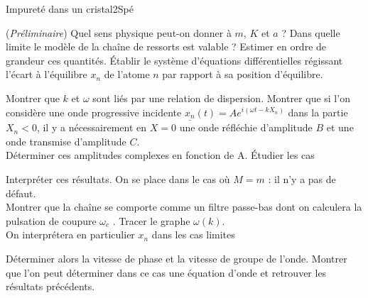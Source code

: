 \begin{exercise}{Impureté dans un cristal}{2}{Spé}
\begin{questions}
\question (\emph{Préliminaire}) Quel sens physique peut-on donner à $m$, $K$ et $a$ ? Dans quelle limite le modèle de la chaîne de ressorts est valable ? Estimer en ordre de grandeur ces quantités.
\question Établir le système d'équations différentielles régissant l'écart à l'équilibre $x_n$ de l’atome $n$ par rapport à sa position d’équilibre.

\question Montrer que $k$ et $\omega$ sont liés par une relation de dispersion.
\question Montrer que si l’on considère une onde progressive incidente $\underline{x_n}(t) = A e^{i(\omega t -  k X_n)}$ dans la partie $X_n<0$, il y a nécessairement en $X=0$ une onde réfléchie d’amplitude $B$ et une onde transmise d’amplitude $C$.\\
Déterminer ces amplitudes complexes en fonction de A.
\question Étudier les cas
Interpréter ces résultats.
\question On se place dans le cas où $M = m$ : il n’y a pas de défaut. \\
Montrer que la chaîne se comporte comme un filtre passe-bas dont on calculera la pulsation de coupure $\omega_c$ . Tracer le graphe $\omega(k)$. \\
On interprétera en particulier $x_n$ dans les cas limites
\question Déterminer alors la vitesse de phase et la vitesse de groupe
de l’onde. Montrer que l’on peut déterminer dans ce cas une équation d’onde et retrouver les résultats précédents.
\end{questions}
\end{exercise}